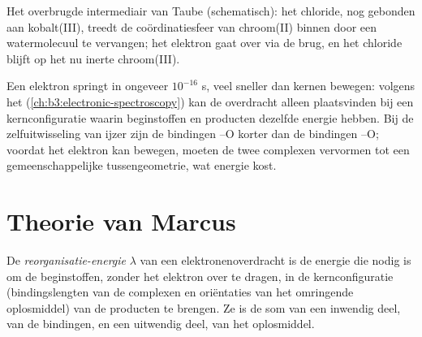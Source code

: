 \begin{omfigure}

{\small Het overbrugde intermediair van Taube (schematisch): het chloride,
nog gebonden aan kobalt(III), treedt de coördinatiesfeer van chroom(II)
binnen door een watermolecuul te vervangen; het elektron gaat over via de
brug, en het chloride blijft op het nu inerte chroom(III).}
\end{omfigure}

Een elektron springt in ongeveer $10^{-16}$ s, veel sneller dan kernen bewegen: volgens
het  (\cref{ch:b3:electronic-spectroscopy}) kan de
overdracht alleen plaatsvinden bij een kernconfiguratie waarin
beginstoffen en producten dezelfde energie hebben. Bij de
zelfuitwisseling van ijzer zijn de bindingen --O korter dan
de bindingen --O; voordat het elektron kan bewegen, moeten de twee complexen vervormen tot
een gemeenschappelijke tussengeometrie, wat energie kost.

\section{Theorie van Marcus}

\begin{definition}\label{def:b3:complex-mechanisms:reorganisation}
De \emph{reorganisatie-energie} $\lambda$ van
een elektronenoverdracht is de energie die nodig is om de beginstoffen,
zonder het elektron over te dragen, in de kernconfiguratie
(bindingslengten van de complexen en oriëntaties van het omringende
oplosmiddel) van de producten te brengen. Ze is de som van een inwendig
deel, van de bindingen, en een uitwendig deel, van het oplosmiddel.
\end{definition}

